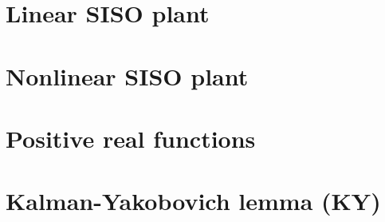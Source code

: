 \section{Linear SISO plant}


\section{Nonlinear SISO plant}


\section{Positive real functions}


\section{Kalman-Yakobovich lemma (KY)}


